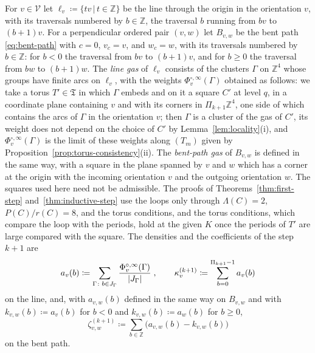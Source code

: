 \documentclass[11pt]{preprint}
\DeclarePairedDelimiter{\abs}{\lvert}{\rvert}
\numberwithin{equation}{section}
\theoremstyle{definition}
\theoremstyle{remark}
\theoremstyle{plain}
\begin{document}
For $v \in \mathcal V$ let $\ell_v \coloneqq \{ tv \, | \, t \in \mathbb Z \}$ be the line through the origin in the orientation $v$, with its traversals numbered by $b \in \mathbb Z$, the traversal $b$ running from $bv$ to $(b + 1)v$. For a perpendicular ordered pair $(v, w)$ let $B_{v,w}$ be the bent path \eqref{eq:bent-path} with $c = 0$, $v_c = v$, and $w_c = w$, with its traversals numbered by $b \in \mathbb Z$: for $b < 0$ the traversal from $bv$ to $(b + 1)v$, and for $b \geq 0$ the traversal from $bw$ to $(b + 1)w$. The \emph{line gas} of $\ell_v$ consists of the clusters $\Gamma$ on $\mathbb Z^4$ whose groups have finite arcs on $\ell_v$, with the weights $\Phi^{\circ,\infty}_v(\Gamma)$ obtained as follows: we take a torus $T' \in \mathfrak T$ in which $\Gamma$ embeds and on it a square $C'$ at level $q$, in a coordinate plane containing $v$ and with its corners in $\Pi_{k+1}\mathbb Z^4$, one side of which contains the arcs of $\Gamma$ in the orientation $v$; then $\Gamma$ is a cluster of the gas of $C'$, its weight does not depend on the choice of $C'$ by Lemma~\ref{lem:locality}(i), and $\Phi^{\circ,\infty}_v(\Gamma)$ is the limit of these weights along $(T_m)$ given by Proposition~\ref{prop:torus-consistency}(ii). The \emph{bent-path gas} of $B_{v,w}$ is defined in the same way, with a square in the plane spanned by $v$ and $w$ which has a corner at the origin with the incoming orientation $v$ and the outgoing orientation $w$. The squares used here need not be admissible. The proofs of Theorems~\ref{thm:first-step} and~\ref{thm:inductive-step} use the loops only through $\Lambda(C) = 2$, $P(C)/r(C) = 8$, and the torus conditions, and the torus conditions, which compare the loop with the periods, hold at the given $K$ once the periods of $T'$ are large compared with the square. The densities and the coefficients of the step $k + 1$ are
\begin{equation}\label{eq:line-coefficient}
    a_v(b) \coloneqq \sum_{\Gamma\colon b \in J_\Gamma}\frac{\Phi^{\circ,\infty}_v(\Gamma)}{\abs{J_\Gamma}}\;,
    \qquad
    \kappa^{(k+1)}_v \coloneqq \sum_{b=0}^{\Pi_{k+1}-1}a_v(b)
\end{equation}
on the line, and, with $a_{v,w}(b)$ defined in the same way on $B_{v,w}$ and with $k_{v,w}(b) \coloneqq a_v(b)$ for $b < 0$ and $k_{v,w}(b) \coloneqq a_w(b)$ for $b \geq 0$,
\begin{equation}\label{eq:corner-coefficient}
    \zeta^{(k+1)}_{v,w} \coloneqq \sum_{b \in \mathbb Z}\bigl(a_{v,w}(b) - k_{v,w}(b)\bigr)
\end{equation}
on the bent path.
\end{document}
